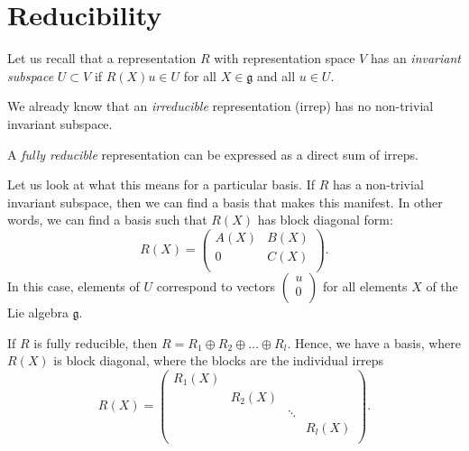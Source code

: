 \section{Reducibility}%
\label{sec:reducibility}

\begin{definition}[]
  Let us recall that a representation $R$ with representation space $V$ has an \emph{invariant subspace} $U \subset V$ if $R(X) u \in U$ for all $X \in \mathfrak{g}$ and all $u \in U$.
\end{definition}
We already know that an \emph{irreducible} representation (irrep) has no non-trivial invariant subspace.
\begin{definition}[]
  A \emph{fully reducible} representation can be expressed as a direct sum of irreps.
\end{definition}
Let us look at what this means for a particular basis.
If $R$ has a non-trivial invariant subspace, then we can find a basis that makes this manifest. In other words, we can find a basis such that $R(X)$ has block diagonal form:
\begin{equation}
  R(X) = 
  \begin{pmatrix}
    A(X) & B(X) \\
    0 & C(X) \\
  \end{pmatrix}.
\end{equation}
In this case, elements of $U$ correspond to vectors \(\begin{pmatrix}
u \\
0 \\
\end{pmatrix}\) for all elements $X$ of the Lie algebra $\mathfrak{g}$.

If $R$ is fully reducible, then $R = R_1 \oplus R_2 \oplus \dots \oplus R_l$.
Hence, we have a basis, where $R(X)$ is block diagonal, where the blocks are the individual irreps
\begin{equation}
  R(X) = 
  \begin{pmatrix}
    R_1(X) &  &  &  \\
	   & R_2(X) &  &  \\
    &  & \ddots &  \\
    &  &  & R_l(X) \\
  \end{pmatrix}.
\end{equation}


